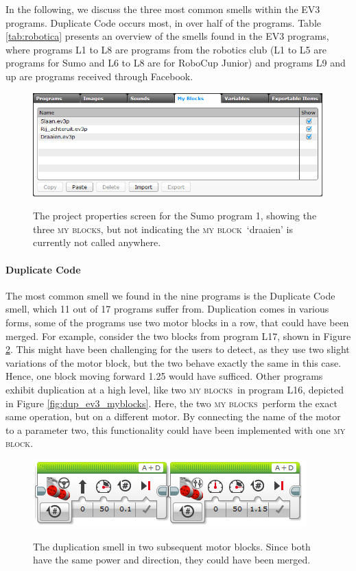\documentclass{sig-alternate}
\newcommand{\mbs}{\textsc{my blocks}}
\newcommand{\mb}{\textsc{my block}}
\begin{document}
In the following, we discuss the three most common smells within the EV3 programs. Duplicate Code occurs most, in over half of the programs. Table \ref{tab:robotica} presents an overview of the smells found in the EV3 programs, where programs L1 to L8 are programs from the robotics club (L1 to L5 are programs for Sumo and L6 to L8 are for RoboCup Junior) and programs L9 and up are programs received through Facebook.

\begin{figure} [ht]
\caption{The project properties screen for the Sumo program 1, showing the three \mbs, but not indicating the \mb~`draaien' is currently not called anywhere.}
\centering
\includegraphics[width=\columnwidth]{img/overview-small}
\label{fig:overview}
\end{figure}

\paragraph{Duplicate Code}
The most common smell we found in the nine programs is the Duplicate Code smell, which 11 out of 17 programs suffer from. Duplication comes in various forms, some of the programs use two motor blocks in a row, that could have been merged. For example, consider the two blocks from program L17, shown in Figure \ref{fig:dup_ev3}. This might have been challenging for the users to detect, as they use two slight variations of the motor block, but the two behave exactly the same in this case. Hence, one block moving forward 1.25 would have sufficed. Other programs exhibit duplication at a high level, like two \mbs~in program L16, depicted in Figure \ref{fig:dup_ev3_myblocks}. Here, the two \mbs~perform the exact same operation, but on a different motor. By connecting the name of the motor to a parameter two, this functionality could have been implemented with one \mb.

\begin{figure} [ht]
\caption{The duplication smell in two subsequent motor blocks. Since both have the same power and direction, they could have been merged. }
\centering
\includegraphics[width=\columnwidth]{img/dup_ev3}
\label{fig:dup_ev3}
\end{figure}
\end{document}
